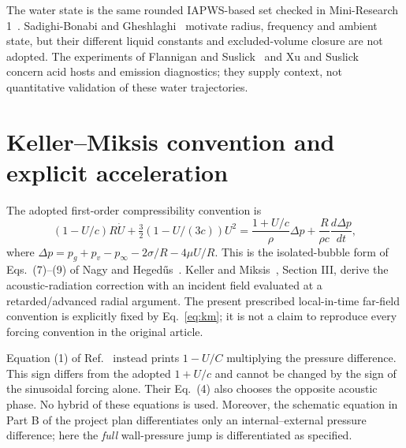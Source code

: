 \documentclass[10pt,a4paper]{article}
\begin{document}
\begin{table}[H]\centering\small
\caption{Fixed reference values and provenance. No property was measured in this study. L: literature setting; P: literature liquid property; A: assumption; D: derived. Full units and provenance are in the data schema.}

\end{table}
The water state is the same rounded IAPWS-based set checked in Mini-Research 1~\cite{iapws}. Sadighi-Bonabi and Gheshlaghi~\cite{sadighi} motivate radius, frequency and ambient state, but their different liquid constants and excluded-volume closure are not adopted. The experiments of Flannigan and Suslick~\cite{flannigan} and Xu and Suslick~\cite{xu} concern acid hosts and emission diagnostics; they supply context, not quantitative validation of these water trajectories.

\newpage
\section{Keller--Miksis convention and explicit acceleration}
The adopted first-order compressibility convention is
\begin{equation}\label{eq:km}
 (1-U/c)R\dot U+\tfrac32(1-U/(3c))U^2
 =\frac{1+U/c}{\rho}\Delta p+\frac{R}{\rho c}\frac{d\Delta p}{dt},
\end{equation}
where $\Delta p=p_g+p_v-p_\infty-2\sigma/R-4\mu U/R$. This is the isolated-bubble form of Eqs.~(7)--(9) of Nagy and Heged\H us~\cite{nagy}. Keller and Miksis~\cite{keller}, Section III, derive the acoustic-radiation correction with an incident field evaluated at a retarded/advanced radial argument. The present prescribed local-in-time far-field convention is explicitly fixed by Eq.~\eqref{eq:km}; it is not a claim to reproduce every forcing convention in the original article.

Equation (1) of Ref.~\cite{sadighi} instead prints $1-U/C$ multiplying the pressure difference. This sign differs from the adopted $1+U/c$ and cannot be changed by the sign of the sinusoidal forcing alone. Their Eq.~(4) also chooses the opposite acoustic phase. No hybrid of these equations is used. Moreover, the schematic equation in Part B of the project plan differentiates only an internal--external pressure difference; here the \emph{full} wall-pressure jump is differentiated as specified.
\end{document}
